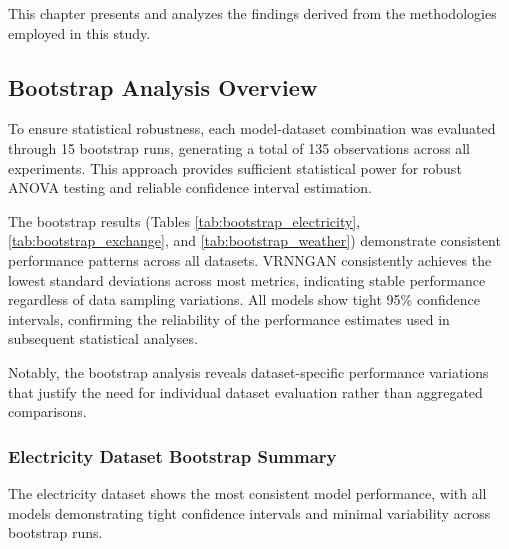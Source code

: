 \documentclass{article}
\begin{document}
This chapter presents and analyzes the findings derived from the methodologies employed in this study.

\subsection{Bootstrap Analysis Overview}
To ensure statistical robustness, each model-dataset combination was evaluated through 15 bootstrap runs, generating a total of 135 observations across all experiments. This approach provides sufficient statistical power for robust ANOVA testing and reliable confidence interval estimation.

The bootstrap results (Tables \ref{tab:bootstrap_electricity}, \ref{tab:bootstrap_exchange}, and \ref{tab:bootstrap_weather}) demonstrate consistent performance patterns across all datasets. VRNNGAN consistently achieves the lowest standard deviations across most metrics, indicating stable performance regardless of data sampling variations. All models show tight 95\% confidence intervals, confirming the reliability of the performance estimates used in subsequent statistical analyses.

Notably, the bootstrap analysis reveals dataset-specific performance variations that justify the need for individual dataset evaluation rather than aggregated comparisons.
\subsubsection{Electricity Dataset Bootstrap Summary}
The electricity dataset shows the most consistent model performance, with all models demonstrating tight confidence intervals and minimal variability across bootstrap runs.
\end{document}
